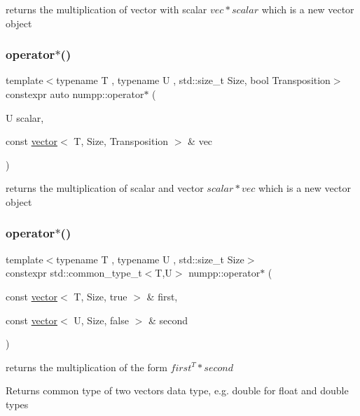 returns the multiplication of vector with scalar $vec*scalar$ which is a new vector object\mbox{\label{group__numpp__structures__vector_gae2786c050a7f51f3f0c9d23e2093de91}} 
\subsubsection{\texorpdfstring{operator$\ast$()}{operator*()}\hspace{0.1cm}{\footnotesize\ttfamily [3/5]}}
{\footnotesize\ttfamily template$<$typename T , typename U , std\+::size\+\_\+t Size, bool Transposition$>$ \\
constexpr auto numpp\+::operator$\ast$ (\begin{DoxyParamCaption}\item[{U}]{scalar,  }\item[{const \hyperlink{classnumpp_1_1vector}{vector}$<$ T, Size, Transposition $>$ \&}]{vec }\end{DoxyParamCaption})}

returns the multiplication of scalar and vector $scalar*vec$ which is a new vector object\mbox{\label{group__numpp__structures__vector_ga8d85eefc2eadd9008013c43e7e90f65f}} 
\subsubsection{\texorpdfstring{operator$\ast$()}{operator*()}\hspace{0.1cm}{\footnotesize\ttfamily [4/5]}}
{\footnotesize\ttfamily template$<$typename T , typename U , std\+::size\+\_\+t Size$>$ \\
constexpr std\+::common\+\_\+type\+\_\+t$<$T,U$>$ numpp\+::operator$\ast$ (\begin{DoxyParamCaption}\item[{const \hyperlink{classnumpp_1_1vector}{vector}$<$ T, Size, true $>$ \&}]{first,  }\item[{const \hyperlink{classnumpp_1_1vector}{vector}$<$ U, Size, false $>$ \&}]{second }\end{DoxyParamCaption})}

returns the multiplication of the form $first^T*second$ \begin{DoxyReturn}{Returns}
common type of two vectors data type, e.\+g. double for float and double types
\end{DoxyReturn}
\mbox{\label{group__numpp__structures__vector_ga79a0f32943f0dde6c938f804d132c42e}} 
